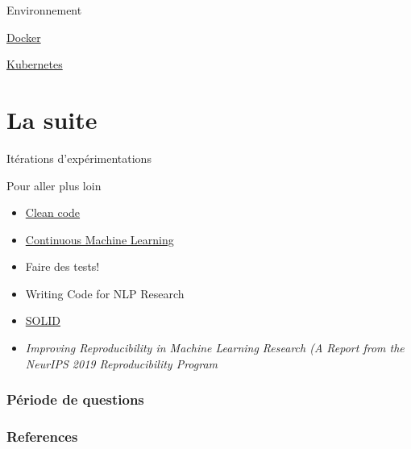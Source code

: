\documentclass[aspectratio=169,10pt,xcolor=x11names,english,french]{beamer}
\begin{document}
	\begin{frame}{Environnement}
			\begin{minipage}{0.49\linewidth}
				\centering
				 \vfil
				\vspace{1em}
				\href{https://www.docker.com/}{Docker}
			\end{minipage}
			\begin{minipage}{0.49\linewidth}
				\centering
				 \vfil
				\vspace{1em}
				\href{https://kubernetes.io/fr/}{Kubernetes}
			\end{minipage}
		\end{frame}
		
	\section{La suite}
	\begin{frame}
		\centering
		\fontsize{35}{35}\selectfont\textcolor[cmyk]{0.67, 0.66, 0, 0.71}\faRefresh\vfil
		\vspace{1em}
		\normalsize Itérations d'expérimentations
	\end{frame}
	
	\begin{frame}{Pour aller plus loin}
		\begin{itemize}
			\item \href{https://www.oreilly.com/library/view/clean-code-a/9780136083238/}{Clean code}
			\item \href{https://github.com/iterative/cml}{Continuous Machine Learning}
			\item Faire des tests!
			\item Writing Code for NLP Research \cite{gardner-etal-2018-writing}
			\item \href{https://www.youtube.com/watch?v=t86v3N4OshQ&list=LLFp5G_2HoipBrGaw9iAcPPw&index=693}{SOLID}
			\item \textit{Improving Reproducibility in Machine Learning Research (A Report from the NeurIPS 2019 Reproducibility Program} \cite{pineau2020improving}
		\end{itemize}
	\end{frame}
	
	\begin{frame}
		\frametitle{Période de questions}
		
		\centering
		\fontsize{100}{100}\selectfont\textcolor[cmyk]{0.67, 0.66, 0, 0.71}
		\faQuestion
		
	\end{frame}

	
	
	\begin{frame}[t, allowframebreaks]
		\frametitle{References}
		
		
	\end{frame}
	
	
	
\end{document}

